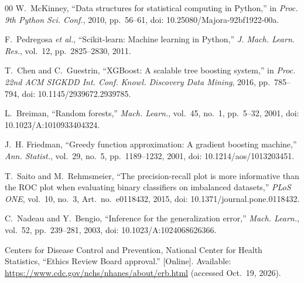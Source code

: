 \documentclass[conference]{IEEEtran}
\begin{document}
\begin{thebibliography}{00}
 W.~McKinney, ``Data structures for statistical computing in Python,'' in \textit{Proc. 9th Python Sci. Conf.}, 2010, pp.~56--61, doi: 10.25080/Majora-92bf1922-00a.

 F.~Pedregosa \textit{et al.}, ``Scikit-learn: Machine learning in Python,'' \textit{J. Mach. Learn. Res.}, vol.~12, pp.~2825--2830, 2011.

 T.~Chen and C.~Guestrin, ``XGBoost: A scalable tree boosting system,'' in \textit{Proc. 22nd ACM SIGKDD Int. Conf. Knowl. Discovery Data Mining}, 2016, pp.~785--794, doi: 10.1145/2939672.2939785.

 L.~Breiman, ``Random forests,'' \textit{Mach. Learn.}, vol.~45, no.~1, pp.~5--32, 2001, doi: 10.1023/A:1010933404324.

 J.~H. Friedman, ``Greedy function approximation: A gradient boosting machine,'' \textit{Ann. Statist.}, vol.~29, no.~5, pp.~1189--1232, 2001, doi: 10.1214/aos/1013203451.

 T.~Saito and M.~Rehmsmeier, ``The precision-recall plot is more informative than the ROC plot when evaluating binary classifiers on imbalanced datasets,'' \textit{PLoS ONE}, vol.~10, no.~3, Art.~no.~e0118432, 2015, doi: 10.1371/journal.pone.0118432.

 C.~Nadeau and Y.~Bengio, ``Inference for the generalization error,'' \textit{Mach. Learn.}, vol.~52, pp.~239--281, 2003, doi: 10.1023/A:1024068626366.

 Centers for Disease Control and Prevention, National Center for Health Statistics, ``Ethics Review Board approval.'' [Online]. Available: \url{https://www.cdc.gov/nchs/nhanes/about/erb.html} (accessed Oct.~19, 2026).

\end{thebibliography}
\end{document}
